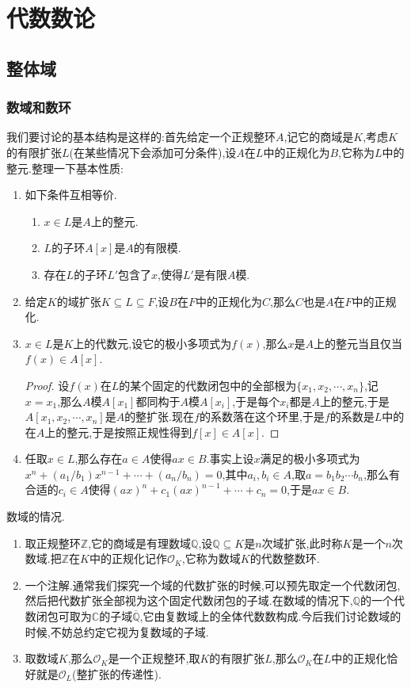 \chapter{代数数论}
\section{整体域}
\subsection{数域和数环}

我们要讨论的基本结构是这样的:首先给定一个正规整环$A$,记它的商域是$K$,考虑$K$的有限扩张$L$(在某些情况下会添加可分条件),设$A$在$L$中的正规化为$B$,它称为$L$中的整元.整理一下基本性质:
\begin{enumerate}
	\item 如下条件互相等价.
	\begin{enumerate}
		\item $x\in L$是$A$上的整元.
		\item $L$的子环$A[x]$是$A$的有限模.
		\item 存在$L$的子环$L'$包含了$x$,使得$L'$是有限$A$模.
	\end{enumerate}
    \item 给定$K$的域扩张$K\subseteq L\subseteq F$,设$B$在$F$中的正规化为$C$,那么$C$也是$A$在$F$中的正规化.
    \item $x\in L$是$K$上的代数元,设它的极小多项式为$f(x)$,那么$x$是$A$上的整元当且仅当$f(x)\in A[x]$.
    \begin{proof}
    	
    	设$f(x)$在$L$的某个固定的代数闭包中的全部根为$\{x_1,x_2,\cdots,x_n\}$,记$x=x_1$,那么$A$模$A[x_1]$都同构于$A$模$A[x_i]$,于是每个$x_i$都是$A$上的整元,于是$A[x_1,x_2,\cdots,x_n]$是$A$的整扩张.现在$f$的系数落在这个环里,于是$f$的系数是$L$中的在$A$上的整元,于是按照正规性得到$f[x]\in A[x]$.
    \end{proof}
    \item 任取$x\in L$,那么存在$a\in A$使得$ax\in B$.事实上设$x$满足的极小多项式为$x^n+(a_1/b_1)x^{n-1}+\cdots+(a_n/b_n)=0$,其中$a_i,b_i\in A$,取$a=b_1b_2\cdots b_n$,那么有合适的$c_i\in A$使得$(ax)^n+c_1(ax)^{n-1}+\cdots+c_n=0$,于是$ax\in B$.
\end{enumerate}

数域的情况.
\begin{enumerate}
	\item 取正规整环$\mathbb{Z}$,它的商域是有理数域$\mathbb{Q}$,设$\mathbb{Q}\subseteq K$是$n$次域扩张,此时称$K$是一个$n$次数域.把$\mathbb{Z}$在$K$中的正规化记作$\mathscr{O}_K$,它称为数域$K$的代数整数环.
	\item 一个注解.通常我们探究一个域的代数扩张的时候,可以预先取定一个代数闭包,然后把代数扩张全部视为这个固定代数闭包的子域.在数域的情况下,$\mathbb{Q}$的一个代数闭包可取为$\mathbb{C}$的子域$\overline{\mathbb{Q}}$,它由复数域上的全体代数数构成.今后我们讨论数域的时候,不妨总约定它视为复数域的子域.
	\item 取数域$K$,那么$\mathscr{O}_K$是一个正规整环,取$K$的有限扩张$L$,那么$\mathscr{O}_K$在$L$中的正规化恰好就是$\mathscr{O}_L$(整扩张的传递性).
\end{enumerate}

